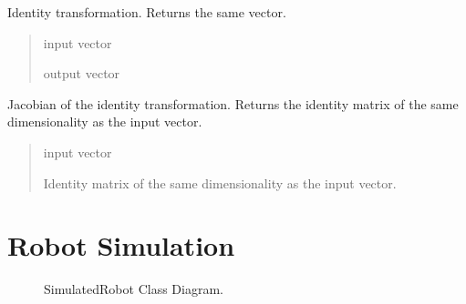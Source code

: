\documentclass[letterpaper,10pt,english]{sphinxmanual}
\begin{document}
\begin{fulllineitems}
\label{\detokenize{conversions:conversions.v2v}}
\pysigstartsignatures
{}
\pysigstopsignatures
\sphinxAtStartPar
Identity transformation. Returns the same vector.
\begin{quote}\begin{description}
\sphinxAtStartPar
{} \textendash{} input vector

\sphinxAtStartPar
output vector

\end{description}\end{quote}

\end{fulllineitems}


\begin{fulllineitems}
\label{\detokenize{conversions:conversions.J_v2v}}
\pysigstartsignatures
{}
\pysigstopsignatures
\sphinxAtStartPar
Jacobian of the identity transformation. Returns the identity matrix of the same dimensionality as the input vector.
\begin{quote}\begin{description}
\sphinxAtStartPar
{} \textendash{} input vector

\sphinxAtStartPar
Identity matrix of the same dimensionality as the input vector.

\end{description}\end{quote}

\end{fulllineitems}


\sphinxstepscope


\section{Robot Simulation}
\label{\detokenize{robot_simulation:robot-simulation}}\label{\detokenize{robot_simulation::doc}}
\begin{figure}[htbp]
\centering
\capstart

\noindent{}
\caption{SimulatedRobot Class Diagram.}\label{\detokenize{robot_simulation:id1}}\end{figure}
\end{document}
